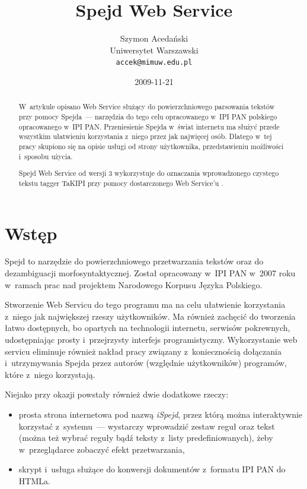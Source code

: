 \documentclass[11pt]{article}
\title{Spejd Web Service}
\author{Szymon Acedański\\
  Uniwersytet Warszawski\\
  {\tt accek@mimuw.edu.pl}}
\date{2009-11-21}
\begin{document}
\maketitle
\begin{abstract}
W~artykule opisano Web Service służący do powierzchniowego parsowania tekstów
przy pomocy Spejda~--- narzędzia do tego celu opracowanego w~IPI PAN
polskiego opracowanego w~IPI PAN. Przeniesienie Spejda w~świat internetu ma służyć
przede wszystkim ułatwieniu korzystania z~niego przez jak najwięcej osób.
Dlatego w~tej pracy skupiono się na opisie usługi od strony użytkownika,
przedstawieniu możliwości i~sposobu użycia.

Spejd Web Service od wersji 3 wykorzystuje do oznaczania wprowadzonego czystego
tekstu tagger TaKIPI \cite{takipi} przy pomocy dostarczonego Web Service'u
\cite{takipiws}.

\end{abstract}

\section{Wstęp}

Spejd \cite{spejd} to narzędzie do powierzchniowego przetwarzania tekstów oraz do
dezambiguacji morfosyntaktycznej. Został opracowany w~IPI PAN w~2007 roku
w~ramach prac nad projektem Narodowego Korpusu Języka Polskiego. 

Stworzenie Web Servicu do tego programu ma na celu ułatwienie
korzystania z~niego jak największej rzeszy użytkowników. Ma również zachęcić
do tworzenia łatwo dostępnych, bo opartych na technologii internetu, serwisów
pokrewnych, udostępniając prosty i~przejrzysty interfejs programistyczny. 
Wykorzystanie web servicu eliminuje również nakład pracy związany z~koniecznością
dołączania i~utrzymywania Spejda przez autorów (względnie użytkowników)
programów, które z~niego korzystają.

Niejako przy okazji powstały również dwie dodatkowe rzeczy:
\begin{itemize}
  \item prosta strona internetowa pod nazwą \emph{iSpejd}, przez którą można
    interaktywnie korzystać z~systemu~--- wystarczy wprowadzić zestaw reguł oraz
    tekst (można też wybrać reguły bądź teksty z~listy predefiniowanych), żeby
    w~przeglądarce zobaczyć efekt przetwarzania,
  \item skrypt i~usługa służące do konwersji dokumentów z~formatu IPI PAN do
    HTMLa.
\end{itemize}
\end{document}
